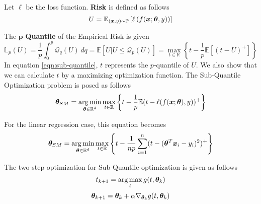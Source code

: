 \documentclass{article} %
\begin{document}
	\begin{definition}
		Let $\ell$ be the loss function. \textbf{Risk} is defined as follows
		\begin{equation}
			U = \mathbb{E}_{({\bm{x}},y) \sim \mathbb{P}}\left[\ell \left( f({\bm{x}};{\bm{\theta}},y)\right)\right]
		\end{equation}
	\end{definition}
	The $\mathbf{p}$-\textbf{Quantile} of the Empirical Risk is given
	\begin{equation}\label{eqn:sub-quantile}
		\mathbb{L}_p(U) = \frac{1}{p}\int_0^p \mathcal{Q}_q(U)\,dq = \mathbb{E}\left[U|U \leq \mathcal{Q}_p(U) \right] = \max_{t\in \mathbb{R}}\left\{t - \frac{1}{p}\mathbb{E}\left[(t-U)^+\right]\right\}
	\end{equation}
	In equation \ref{eqn:sub-quantile}, $t$ represents the $p$-quantile of $U$. We also show that we can calculate $t$ by a maximizing optimization function. 
	The Sub-Quantile Optimization problem is posed as follows
	\begin{equation}
		{\bm{\theta}}_{SM} = \operatorname*{arg\,min}_{{\bm{\theta}} \in \mathbb{R}^d} \max_{t \in \mathbb{R}} \left\{t - \frac{1}{p}\mathbb{E}(t - \ell(f({\bm{x}};{\bm{\theta}}),y))^+\right\}
	\end{equation}
	
	For the linear regression case, this equation becomes 
	\begin{equation}
		\label{eqn:theta_sm}
		{\bm{\theta}}_{SM} = \operatorname*{arg\,min}_{{\bm{\theta}} \in \mathbb{R}^d} \max_{t \in \mathbb{R}} \left\{t - \frac{1}{np}\sum_{i=1}^n(t-({\bm{\theta}}^T{\bm{x}}_i - y_i)^2)^+\right\}
	\end{equation}
		
	The two-step optimization for Sub-Quantile optimization is given as follows \vspace{1em}
	\begin{equation}
		\label{eqn:t-update}
		t_{k+1} = \operatorname*{arg\,max}_t g(t,{\bm{\theta}}_k) 
	\end{equation}
	\begin{equation}
		\label{eqn:theta-update}
		{\bm{\theta}}_{k+1} = {\bm{\theta}}_k + \alpha \nabla_{{\bm{\theta}}_k} g(t,{\bm{\theta}}_k)
	\end{equation}
		
\end{document}
